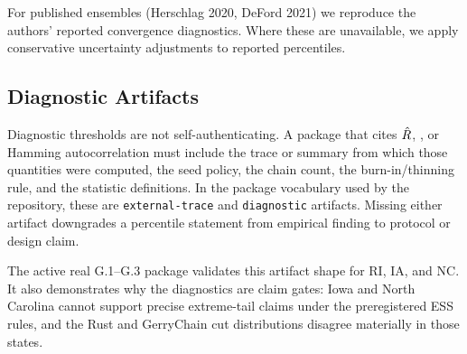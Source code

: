 For published ensembles (Herschlag 2020, DeFord 2021) we reproduce the
authors' reported convergence diagnostics.  Where these are unavailable,
we apply conservative uncertainty adjustments to reported percentiles.

\subsection{Diagnostic Artifacts}

Diagnostic thresholds are not self-authenticating.  A package that cites
$\hat{R}$, \ess{}, or Hamming autocorrelation must include the trace or summary
from which those quantities were computed, the seed policy, the chain count, the
burn-in/thinning rule, and the statistic definitions.  In the package vocabulary
used by the repository, these are \texttt{external-trace} and
\texttt{diagnostic} artifacts.  Missing either artifact downgrades a percentile
statement from empirical finding to protocol or design claim.

The active real G.1--G.3 package validates this artifact shape for RI, IA, and
NC. It also demonstrates why the diagnostics are claim gates: Iowa and North
Carolina cannot support precise extreme-tail claims under the preregistered ESS
rules, and the Rust and GerryChain cut distributions disagree materially in
those states.
